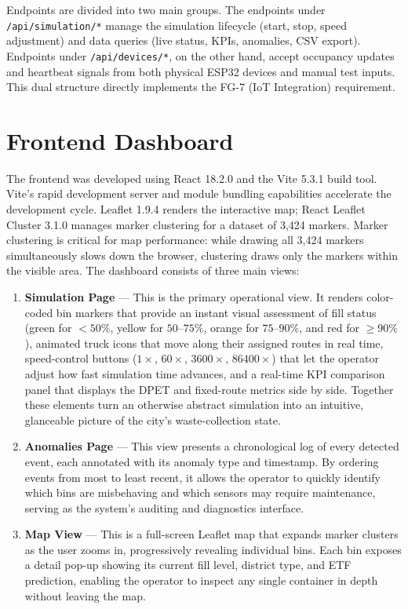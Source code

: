 \documentclass[12pt,a4paper]{report}
\begin{document}
\indent Endpoints are divided into two main groups. The endpoints under \texttt{/api/simulation/*} manage the simulation lifecycle (start, stop, speed adjustment) and data queries (live status, KPIs, anomalies, CSV export). Endpoints under \texttt{/api/devices/*}, on the other hand, accept occupancy updates and heartbeat signals from both physical ESP32 devices and manual test inputs. This dual structure directly implements the FG-7 (IoT Integration) requirement.

\section{Frontend Dashboard}

\indent The frontend was developed using React 18.2.0 and the Vite 5.3.1 build tool. Vite’s rapid development server and module bundling capabilities accelerate the development cycle. Leaflet 1.9.4 renders the interactive map; React Leaflet Cluster 3.1.0 manages marker clustering for a dataset of 3,424 markers. Marker clustering is critical for map performance: while drawing all 3,424 markers simultaneously slows down the browser, clustering draws only the markers within the visible area. The dashboard consists of three main views:

\begin{enumerate}[leftmargin=2cm]
  \item \textbf{Simulation Page} --- This is the primary operational view. It renders color-coded bin markers that provide an instant visual assessment of fill status (green for $<50\%$, yellow for $50$--$75\%$, orange for $75$--$90\%$, and red for $\geq 90\%$), animated truck icons that move along their assigned routes in real time, speed-control buttons ($1\times$, $60\times$, $3600\times$, $86400\times$) that let the operator adjust how fast simulation time advances, and a real-time KPI comparison panel that displays the DPET and fixed-route metrics side by side. Together these elements turn an otherwise abstract simulation into an intuitive, glanceable picture of the city's waste-collection state.
  \item \textbf{Anomalies Page} --- This view presents a chronological log of every detected event, each annotated with its anomaly type and timestamp. By ordering events from most to least recent, it allows the operator to quickly identify which bins are misbehaving and which sensors may require maintenance, serving as the system's auditing and diagnostics interface.
  \item \textbf{Map View} --- This is a full-screen Leaflet map that expands marker clusters as the user zooms in, progressively revealing individual bins. Each bin exposes a detail pop-up showing its current fill level, district type, and ETF prediction, enabling the operator to inspect any single container in depth without leaving the map.
\end{enumerate}
\end{document}
